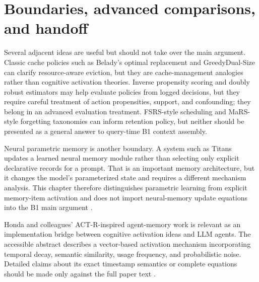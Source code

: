 \section{Boundaries, advanced comparisons, and handoff}
\label{sec:ch12-boundaries}

Several adjacent ideas are useful but should not take over the main argument. Classic cache policies such as Belady's optimal replacement and GreedyDual-Size can clarify resource-aware eviction, but they are cache-management analogies rather than cognitive activation theories. Inverse propensity scoring and doubly robust estimators may help evaluate policies from logged decisions, but they require careful treatment of action propensities, support, and confounding; they belong in an advanced evaluation treatment. FSRS-style scheduling and MaRS-style forgetting taxonomies can inform retention policy, but neither should be presented as a general answer to query-time B1 context assembly.

Neural parametric memory is another boundary. A system such as Titans updates a learned neural memory module rather than selecting only explicit declarative records for a prompt. That is an important memory architecture, but it changes the model's parameterized state and requires a different mechanism analysis. This chapter therefore distinguishes parametric learning from explicit memory-item activation and does not import neural-memory update equations into the B1 main argument \autocite{behrouz2025titans}.

Honda and colleagues' ACT-R-inspired agent-memory work is relevant as an implementation bridge between cognitive activation ideas and LLM agents. The accessible abstract describes a vector-based activation mechanism incorporating temporal decay, semantic similarity, usage frequency, and probabilistic noise. Detailed claims about its exact timestamp semantics or complete equations should be made only against the full paper text \autocite{honda2026actragentmemory}.

